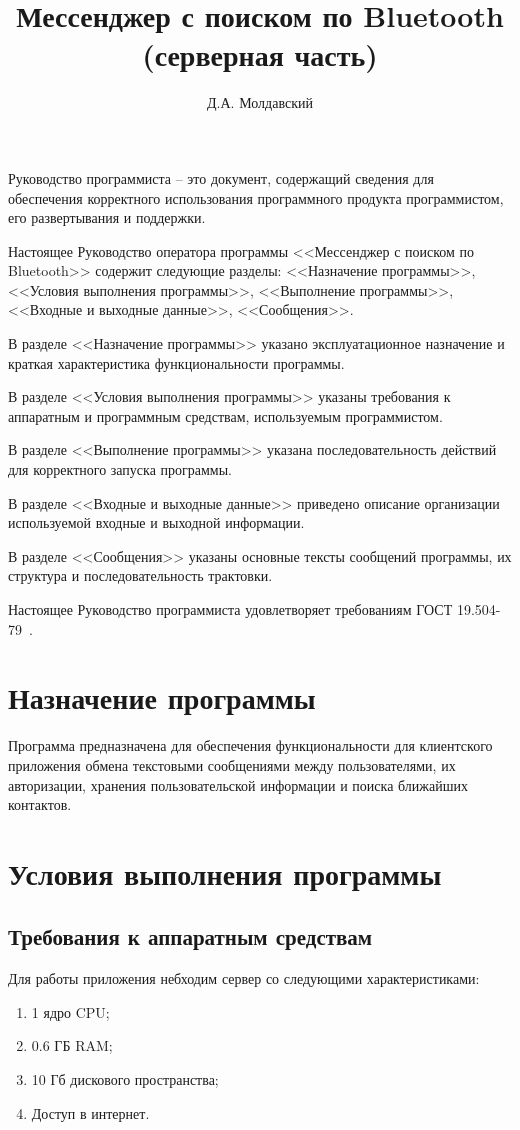 \documentclass[progmanual]{espd}
\author{Д.А. Молдавский}
\title{Мессенджер с поиском по Bluetooth\\(серверная часть)}
\begin{document}
\annotation

Руководство программиста -- это документ, содержащий сведения для обеспечения корректного использования программного продукта программистом, его развертывания и поддержки.

Настоящее Руководство оператора программы <<Мессенджер с поиском по Bluetooth>>  содержит следующие разделы: <<Назначение программы>>, <<Условия выполнения программы>>, <<Выполнение программы>>, <<Входные и выходные данные>>, <<Сообщения>>.

В разделе <<Назначение программы>> указано эксплуатационное назначение и краткая характеристика функциональности программы.

В разделе <<Условия выполнения программы>> указаны требования к аппаратным и программным средствам, используемым программистом.

В разделе <<Выполнение программы>> указана последовательность действий для корректного запуска программы.

В разделе <<Входные и выходные данные>> приведено описание организации используемой входные и выходной информации.

В разделе <<Сообщения>> указаны основные тексты сообщений программы, их структура и последовательность трактовки.

Настоящее Руководство программиста удовлетворяет требованиям ГОСТ 19.504-79~\cite{espd504}.

\tableofcontents

\section{Назначение программы}
Программа предназначена для обеспечения функциональности для клиентского приложения обмена текстовыми сообщениями между пользователями, их авторизации, хранения пользовательской информации и поиска ближайших контактов.

\section{Условия выполнения программы}
\subsection{Требования к аппаратным средствам}
Для работы приложения небходим сервер со следующими характеристиками:

\begin{enumerate}
\item 1 ядро CPU;
\item 0.6 ГБ RAM;
\item 10 Гб дискового пространства;
\item Доступ в интернет.
\end{enumerate}
\end{document}
